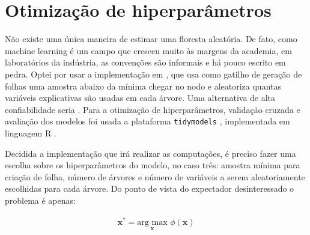 \begin{figure}[H]
    \centering
    
\end{figure}


\section{Otimização de hiperparâmetros}

Não existe uma única maneira de estimar uma floresta aleatória. De fato, como machine learning é um campo que cresceu muito às margens da academia, em laboratórios da indústria, as convenções são informais e há pouco escrito em pedra. Optei por usar a implementação em , que usa como gatilho de geração de folhas uma amostra abaixo da mínima chegar no nodo e aleatoriza quantas variáveis explicativas são usadas em cada árvore. Uma alternativa de alta confiabilidade seria . Para a otimização de hiperparâmetros, validação cruzada e avaliação dos modelos foi usada a plataforma \texttt{tidymodels} \cite{tidymodels}, implementada em linguagem R \cite{R}.

Decidida a implementação que irá realizar as computações, é preciso fazer uma escolha sobre os hiperparâmetros do modelo, no caso três: amostra mínima para criação de folha, número de árvores e número de variáveis a serem aleatoriamente escolhidas para cada árvore. Do ponto de vista do expectador desinteressado o problema é apenas:

\begin{align}
    \mathbf{x}^* = \underset{\mathbf{x}}{\text{arg max}} \,\,\phi(\mathbf{x}) 
\end{align}

